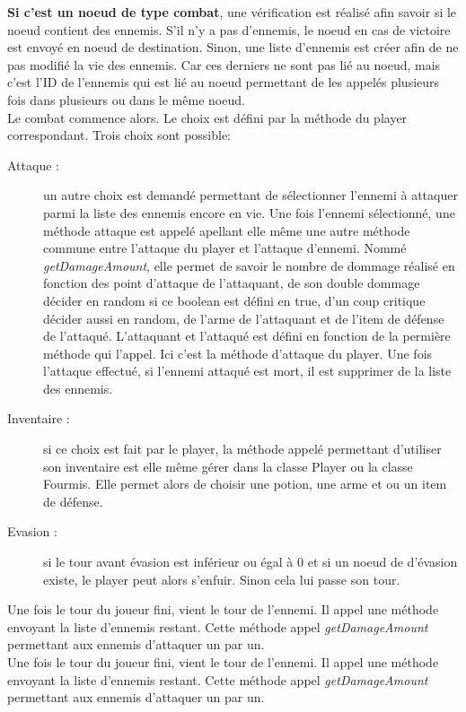 		\textbf{Si c'est un noeud de type combat}, une vérification est réalisé afin savoir si le noeud contient des ennemis. S'il n'y a pas d'ennemis, le noeud en cas de victoire est envoyé en noeud de destination. Sinon, une liste d'ennemis est créer afin de ne pas modifié la vie des ennemis. Car ces derniers ne sont pas lié au noeud, mais c'est l'ID de l'ennemis qui est lié au noeud permettant de les appelés plusieurs fois dans plusieurs ou dans le même noeud.\\
		Le combat commence alors. Le choix est défini par la méthode du player correspondant. Trois choix sont possible:\\
		\begin{description}
			\item[Attaque :]{un autre choix est demandé permettant de sélectionner l'ennemi à attaquer parmi la liste des ennemis encore en vie. Une fois l'ennemi sélectionné, une méthode attaque est appelé apellant elle même une autre méthode commune entre l'attaque du player et l'attaque d'ennemi. Nommé \textit{getDamageAmount}, elle permet de savoir le nombre de dommage réalisé en fonction des point d'attaque de l'attaquant, de son double dommage décider en random si ce boolean est défini en true, d'un coup critique décider aussi en random, de l'arme de l'attaquant et de l'item de défense de l'attaqué. L'attaquant et l'attaqué est défini en fonction de la permière méthode qui l'appel. Ici c'est la méthode d'attaque du player.}
			Une fois l'attaque effectué, si l'ennemi attaqué est mort, il est supprimer de la liste des ennemis.
			\item[Inventaire :]{si ce choix est fait par le player, la méthode appelé permettant d'utiliser son inventaire est elle même gérer dans la classe Player ou la classe Fourmis. Elle permet alors de choisir une potion, une arme et ou un item de défense.}
			\item[Evasion :]{si le tour avant évasion est inférieur ou égal à 0 et si un noeud de d'évasion existe, le player peut alors s'enfuir. Sinon cela lui passe son tour.}
		\end{description}

		Une fois le tour du joueur fini, vient le tour de l'ennemi. Il appel une méthode envoyant la liste d'ennemis restant. Cette méthode appel \textit{getDamageAmount} permettant aux ennemis d'attaquer un par un.\\

		Une fois le tour du joueur fini, vient le tour de l'ennemi. Il appel une méthode envoyant la liste d'ennemis restant. Cette méthode appel \textit{getDamageAmount} permettant aux ennemis d'attaquer un par un.

